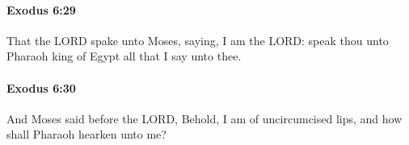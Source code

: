 		\paragraph{Exodus 6:29} %
			\label{EXODUS-6-29}

			That the LORD spake unto Moses, saying, I am the LORD: speak thou unto Pharaoh king of Egypt all that I say unto thee.


		\paragraph{Exodus 6:30} %
			\label{EXODUS-6-30}

			And Moses said before the LORD, Behold, I am of uncircumcised lips, and how shall Pharaoh hearken unto me?

